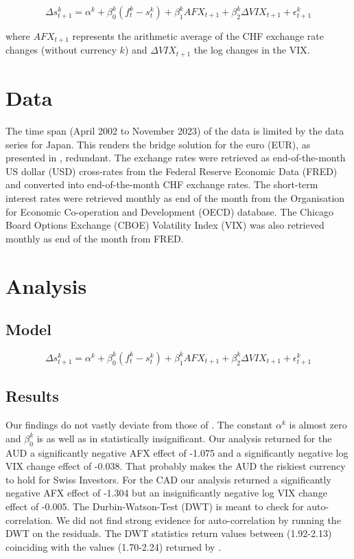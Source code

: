 \documentclass[a4paper,11pt,oneside]{article}
\begin{document}
\begin{equation}\label{5}
\Delta s_{t+1}^k=\alpha^k+\beta_{0}^k(f_{t}^k-s_{t}^k)+\beta_{1}^k AFX_{t+1}+\beta_{2}^k\Delta VIX_{t+1}+\epsilon_{t+1}^k
\end{equation}

where $AFX_{t+1}$ represents the arithmetic average of the CHF exchange rate changes (without currency $k$) and $\Delta VIX_{t+1}$ the log changes in the VIX.\par

\newpage
\section{Data}\label{Data}
The time span (April 2002 to November 2023) of the data is limited by the data series for Japan. This renders the bridge solution for the euro (EUR), as presented in \cite{Grisse and Nitschka 2015}, redundant. The exchange rates were retrieved as end-of-the-month US dollar (USD) cross-rates from the Federal Reserve Economic Data (FRED) and converted into end-of-the-month CHF exchange rates. The short-term interest rates were retrieved monthly as end of the month from the Organisation for Economic Co-operation and Development (OECD) database. The Chicago Board Options Exchange (CBOE) Volatility Index (VIX) was also retrieved monthly as end of the month from FRED.\par
 
\section{Analysis}\label{Analysis}
\subsection{Model}\label{Model}
\begin{equation}\label{5}
\Delta s_{t+1}^k=\alpha^k+\beta_{0}^k(f_{t}^k-s_{t}^k)+\beta_{1}^k AFX_{t+1}+\beta_{2}^k\Delta VIX_{t+1}+\epsilon_{t+1}^k
\end{equation}


\subsection{Results}\label{Results}
Our findings do not vastly deviate from those of \cite{Grisse and Nitschka 2015}. The constant $\alpha^k$ is almost zero and $\beta_{0}^k$ is as well as in \cite{Grisse and Nitschka 2015} statistically insignificant. Our analysis returned for the AUD a significantly negative AFX effect of -1.075 and a significantly negative log VIX change effect of -0.038. That probably makes the AUD the riskiest currency to hold for Swiss Investors. For the CAD our analysis returned a significantly negative AFX effect of -1.304 but an insignificantly negative log VIX change effect of -0.005. The Durbin-Watson-Test (DWT) is meant to check for auto-correlation. We did not find strong evidence for auto-correlation by running the DWT on the residuals. The DWT statistics return values between (1.92-2.13) coinciding with the values (1.70-2.24) returned by \cite{Grisse and Nitschka 2015}.\par
\end{document}
